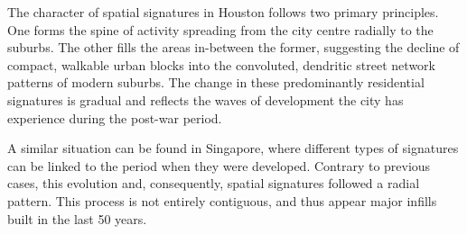 The character of spatial signatures in Houston follows two primary principles.
One  
forms the spine of activity spreading from the city centre radially to the suburbs. The
other fills the areas in-between the former, suggesting the decline of
compact, walkable urban blocks into the convoluted, dendritic street network patterns of
modern suburbs. The change in these predominantly residential signatures is gradual and
reflects the waves of development the city has experience during the post-war
period.

A similar situation can be found in Singapore, where different types of signatures can be linked
to the period when they were developed. Contrary
to previous cases, this evolution and, consequently, spatial signatures
followed a radial pattern. This process is not entirely contiguous, and thus
appear major infills built in the last 50 years.
